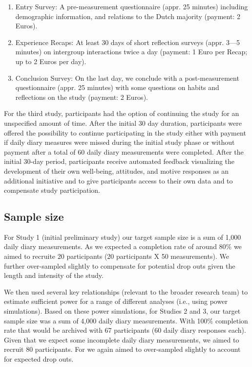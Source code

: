 \documentclass[]{article}
\providecommand{\tightlist}{%
\setlength{\itemsep}{0pt}\setlength{\parskip}{0pt}}
\newcounter{question}
\begin{document}
\begin{enumerate}
\def\labelenumi{\arabic{enumi}.}
\tightlist
\item
  Entry Survey: A pre-measurement questionnaire (appr. 25 minutes)
  including demographic information, and relations to the Dutch majority
  (payment: 2 Euros).
\item
  Experience Recaps: At least 30 days of short reflection surveys (appr.
  3---5 minutes) on intergroup interactions twice a day (payment: 1 Euro
  per Recap; up to 2 Euros per day).
\item
  Conclusion Survey: On the last day, we conclude with a
  post-measurement questionnaire (appr. 25 minutes) with some questions
  on habits and reflections on the study (payment: 2 Euros).
\end{enumerate}

For the third study, participants had the option of continuing the study
for an unspecified amount of time. After the initial 30 day duration,
participants were offered the possibility to continue participating in
the study either with payment if daily diary measures were missed during
the initial study phase or without payment after a total of 60 daily
diary measurements were completed. After the initial 30-day period,
participants receive automated feedback visualizing the development of
their own well-being, attitudes, and motive responses as an additional
initiative and to give participants access to their own data and to
compensate study participation.

\hypertarget{sample-size}{%
\subsection{Sample size}\label{sample-size}}

For Study 1 (initial preliminary study) our target sample size is a sum
of 1,000 daily diary measurements. As we expected a completion rate of
around 80\% we aimed to recruite 20 participants (20 participants X 50
measurements). We further over-sampled slightly to compensate for
potential drop outs given the length and intensity of the study.

We then used several key relationships (relevant to the broader research
team) to estimate sufficient power for a range of different analyses
(i.e., using power simulations). Based on these power simulations, for
Studies 2 and 3, our target sample size was a sum of 4,000 daily diary
measurements. With 100\% completion rate that would be archived with 67
participants (60 daily diary responses each). Given that we expect some
incomplete daily diary measurements, we aimed to recruit 80
participants. For  we again aimed
to over-sampled slightly to account for expected drop outs.
\end{document}
